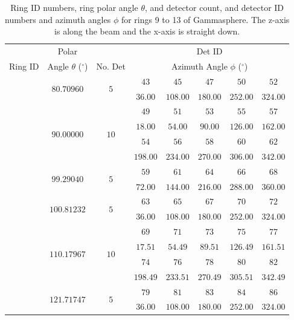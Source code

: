 \begin{table}
\label{tbl:chp3-gs-angles2}
\caption{Ring ID numbers, ring polar angle $\theta$, and detector count, and detector ID numbers and azimuth angles $\phi$ for rings 9 to 13 of Gammasphere. The z-axis is along the beam and the x-axis is straight down.}
\begin{tabular}{|c|c|c|c|c|c|c|c|}
\hline
\hline&Polar&&\multicolumn{5}{|c|}{Det ID}\\ 
Ring ID & Angle $\theta$ ($^{\circ}$) & No. Det&\multicolumn{5}{|c|}{Azimuth Angle $\phi$ ($^{\circ}$)}\\ 
\hline{}\multirow{2}{*}{$8$}&\multirow{2}{*}{$80.70960$}&\multirow{2}{*}{$5$}&$43$&$45$&$47$&$50$&$52$\\
&&&$36.00$&$108.00$&$180.00$&$252.00$&$324.00$\\ 
\hline{}\multirow{4}{*}{$9$}&\multirow{4}{*}{$90.00000$}&\multirow{4}{*}{$10$}&$49$&$51$&$53$&$55$&$57$ \\
&&&$18.00$&$54.00$&$90.00$&$126.00$&$162.00$\\
\cline{4-8}&&&$54$&$56$&$58$&$60$&$62$\\
&&&$198.00$&$234.00$&$270.00$&$306.00$&$342.00$\\   
\hline{}\multirow{2}{*}{$10$}&\multirow{2}{*}{$99.29040$}&\multirow{2}{*}{$5$}&$59$&$61$&$64$&$66$&$68$\\
&&&$72.00$&$144.00$&$216.00$&$288.00$&$360.00$\\ 
\hline{}\multirow{2}{*}{$11$}&\multirow{2}{*}{$100.81232$}&\multirow{2}{*}{$5$}&$63$&$65$&$67$&$70$&$72$\\
&&&$36.00$&$108.00$&$180.00$&$252.00$&$324.00$\\ 
\hline{}\multirow{4}{*}{$12$}&\multirow{4}{*}{$110.17967$}&\multirow{4}{*}{$10$}&$69$&$71$&$73$&$75$&$77$\\
&&&$17.51$&$54.49$&$89.51$&$126.49$&$161.51$\\
\cline{4-8}&&&$74$&$76$&$78$&$80$&$82$\\
&&&$198.49$&$233.51$&$270.49$&$305.51$&$342.49$\\   
\hline{}\multirow{2}{*}{$13$}&\multirow{2}{*}{$121.71747$}&\multirow{2}{*}{$5$}&$79$&$81$&$83$&$84$&$86$\\
&&&$36.00$&$108.00$&$180.00$&$252.00$&$324.00$\\ 
\hline
\hline
\end{tabular} 
\end{table}

